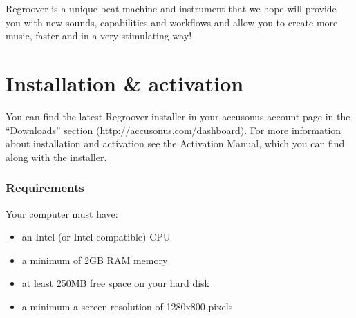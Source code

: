 \documentclass[12pt]{article}
\begin{document}
Regroover is a unique beat machine and instrument that we hope will provide you with new sounds, capabilities and workflows and allow you to create more music, faster and in a very stimulating way! %

\section*{Installation \& activation}
You can find the latest Regroover installer in your accusonus account page in the ``Downloads'' section
(\url{http://accusonus.com/dashboard}). For more information about installation and activation see the Activation Manual, which you can find along with the installer.

\subsubsection*{Requirements}
Your computer must have:
\begin{itemize}
\item an Intel (or Intel compatible) CPU 
\item a minimum of 2GB RAM memory
\item at least 250MB free space on your hard disk
\item a minimum a screen resolution of 1280x800 pixels
\end{itemize}
\end{document}
